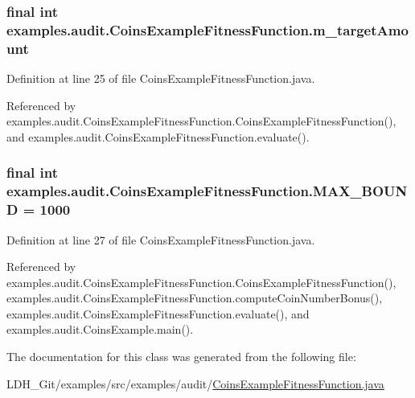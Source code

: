\hypertarget{classexamples_1_1audit_1_1_coins_example_fitness_function_add5c9b674159b5c21bcb5946647441fb}{
\subsubsection[{m\-\_\-target\-Amount}]{\setlength{\rightskip}{0pt plus 5cm}final int examples.\-audit.\-Coins\-Example\-Fitness\-Function.\-m\-\_\-target\-Amount\hspace{0.3cm}{\ttfamily [private]}}}\label{classexamples_1_1audit_1_1_coins_example_fitness_function_add5c9b674159b5c21bcb5946647441fb}


Definition at line 25 of file Coins\-Example\-Fitness\-Function.\-java.



Referenced by examples.\-audit.\-Coins\-Example\-Fitness\-Function.\-Coins\-Example\-Fitness\-Function(), and examples.\-audit.\-Coins\-Example\-Fitness\-Function.\-evaluate().

\hypertarget{classexamples_1_1audit_1_1_coins_example_fitness_function_a8cef507218435b4d205761e8f3ed4341}{
\subsubsection[{M\-A\-X\-\_\-\-B\-O\-U\-N\-D}]{\setlength{\rightskip}{0pt plus 5cm}final int examples.\-audit.\-Coins\-Example\-Fitness\-Function.\-M\-A\-X\-\_\-\-B\-O\-U\-N\-D = 1000\hspace{0.3cm}{\ttfamily [static]}}}\label{classexamples_1_1audit_1_1_coins_example_fitness_function_a8cef507218435b4d205761e8f3ed4341}


Definition at line 27 of file Coins\-Example\-Fitness\-Function.\-java.



Referenced by examples.\-audit.\-Coins\-Example\-Fitness\-Function.\-Coins\-Example\-Fitness\-Function(), examples.\-audit.\-Coins\-Example\-Fitness\-Function.\-compute\-Coin\-Number\-Bonus(), examples.\-audit.\-Coins\-Example\-Fitness\-Function.\-evaluate(), and examples.\-audit.\-Coins\-Example.\-main().



The documentation for this class was generated from the following file\-:\begin{DoxyCompactItemize}
\item 
L\-D\-H\-\_\-\-Git/examples/src/examples/audit/\hyperlink{_coins_example_fitness_function_8java}{Coins\-Example\-Fitness\-Function.\-java}\end{DoxyCompactItemize}
